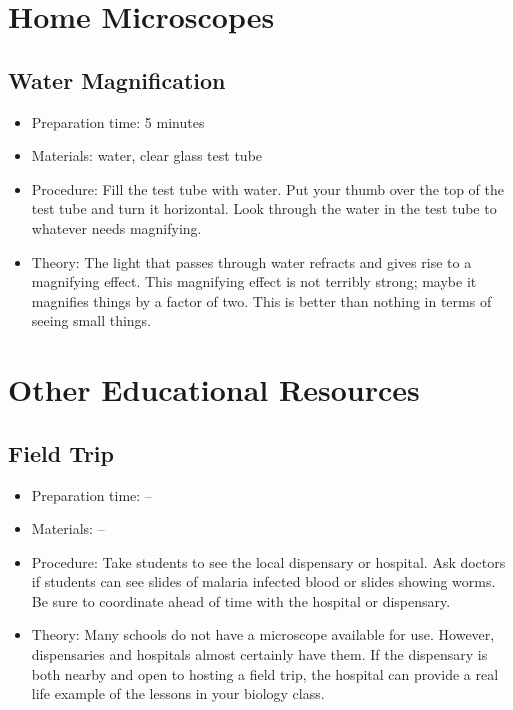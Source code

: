 \section{Home Microscopes}

\subsection{Water Magnification}
\begin{itemize}
\item{Preparation time: 5 minutes}
\item{Materials: water, clear glass test tube}
\item{Procedure: Fill the test tube with water. Put your thumb over the top of the test tube and turn it horizontal. Look through the water in the test tube to whatever needs magnifying.}
\item{Theory: The light that passes through water refracts and gives rise to a magnifying effect. This magnifying effect is not terribly strong; maybe it magnifies things by a factor of two. This is better than nothing in terms of seeing small things.}
\end{itemize}

\section{Other Educational Resources}

\subsection{Field Trip}
\begin{itemize}
\item{Preparation time: --}
\item{Materials: --}
\item{Procedure: Take students to see the local dispensary or hospital. Ask doctors if students can see slides of malaria infected blood or slides showing worms. Be sure to coordinate ahead of time with the hospital or dispensary. }
\item{Theory: Many schools do not have a microscope available for use. However, dispensaries and hospitals almost certainly have them. If the dispensary is both nearby and open to hosting a field trip, the hospital can provide a real life example of the lessons in your biology class. }
\end{itemize}

